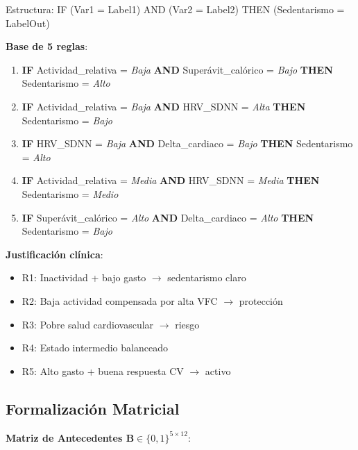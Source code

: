 \documentclass[12pt,letterpaper,twoside]{report}
\newcommand{\mat}[1]{\mathbf{#1}}
\begin{document}
\begin{calculobox}
\begin{estadisticobox}
Estructura: IF (Var1 = Label1) AND (Var2 = Label2) THEN (Sedentarismo = LabelOut)
\end{estadisticobox}

\begin{reglabox}
\textbf{Base de 5 reglas}:

\begin{enumerate}[label=\textbf{R\arabic*:}]
    \item \textbf{IF} Actividad\_relativa = \textit{Baja} \textbf{AND} Superávit\_calórico = \textit{Bajo} \textbf{THEN} Sedentarismo = \textit{Alto}
    
    \item \textbf{IF} Actividad\_relativa = \textit{Baja} \textbf{AND} HRV\_SDNN = \textit{Alta} \textbf{THEN} Sedentarismo = \textit{Bajo}
    
    \item \textbf{IF} HRV\_SDNN = \textit{Baja} \textbf{AND} Delta\_cardiaco = \textit{Bajo} \textbf{THEN} Sedentarismo = \textit{Alto}
    
    \item \textbf{IF} Actividad\_relativa = \textit{Media} \textbf{AND} HRV\_SDNN = \textit{Media} \textbf{THEN} Sedentarismo = \textit{Medio}
    
    \item \textbf{IF} Superávit\_calórico = \textit{Alto} \textbf{AND} Delta\_cardiaco = \textit{Alto} \textbf{THEN} Sedentarismo = \textit{Bajo}
\end{enumerate}

\textbf{Justificación clínica}:
\begin{itemize}[noitemsep]
    \item R1: Inactividad + bajo gasto $\to$ sedentarismo claro
    \item R2: Baja actividad compensada por alta VFC $\to$ protección
    \item R3: Pobre salud cardiovascular $\to$ riesgo
    \item R4: Estado intermedio balanceado
    \item R5: Alto gasto + buena respuesta CV $\to$ activo
\end{itemize}
\end{reglabox}

\subsection{Formalización Matricial}

\begin{calculobox}
\textbf{Matriz de Antecedentes $\mat{B} \in \{0,1\}^{5 \times 12}$}:


\end{calculobox}
\end{calculobox}
\end{document}

